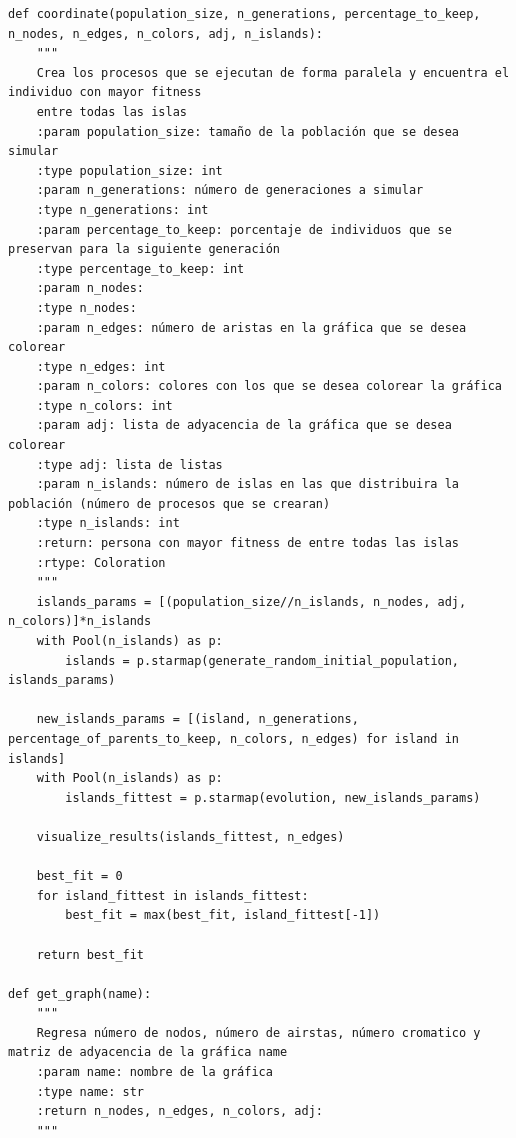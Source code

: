 \documentclass{article}
\begin{document}
{\begin{verbatim}
def coordinate(population_size, n_generations, percentage_to_keep, n_nodes, n_edges, n_colors, adj, n_islands):
    """
    Crea los procesos que se ejecutan de forma paralela y encuentra el individuo con mayor fitness
    entre todas las islas 
    :param population_size: tamaño de la población que se desea simular
    :type population_size: int
    :param n_generations: número de generaciones a simular
    :type n_generations: int
    :param percentage_to_keep: porcentaje de individuos que se preservan para la siguiente generación
    :type percentage_to_keep: int
    :param n_nodes:
    :type n_nodes:
    :param n_edges: número de aristas en la gráfica que se desea colorear 
    :type n_edges: int 
    :param n_colors: colores con los que se desea colorear la gráfica
    :type n_colors: int 
    :param adj: lista de adyacencia de la gráfica que se desea colorear
    :type adj: lista de listas
    :param n_islands: número de islas en las que distribuira la población (número de procesos que se crearan)
    :type n_islands: int 
    :return: persona con mayor fitness de entre todas las islas
    :rtype: Coloration
    """
    islands_params = [(population_size//n_islands, n_nodes, adj, n_colors)]*n_islands
    with Pool(n_islands) as p:
        islands = p.starmap(generate_random_initial_population, islands_params)

    new_islands_params = [(island, n_generations, percentage_of_parents_to_keep, n_colors, n_edges) for island in islands]
    with Pool(n_islands) as p:
        islands_fittest = p.starmap(evolution, new_islands_params)

    visualize_results(islands_fittest, n_edges)
    
    best_fit = 0
    for island_fittest in islands_fittest:
        best_fit = max(best_fit, island_fittest[-1])
    
    return best_fit

def get_graph(name):
    """
    Regresa número de nodos, número de airstas, número cromatico y matriz de adyacencia de la gráfica name
    :param name: nombre de la gráfica 
    :type name: str
    :return n_nodes, n_edges, n_colors, adj: 
    """
    

\end{verbatim}}
\end{document}
